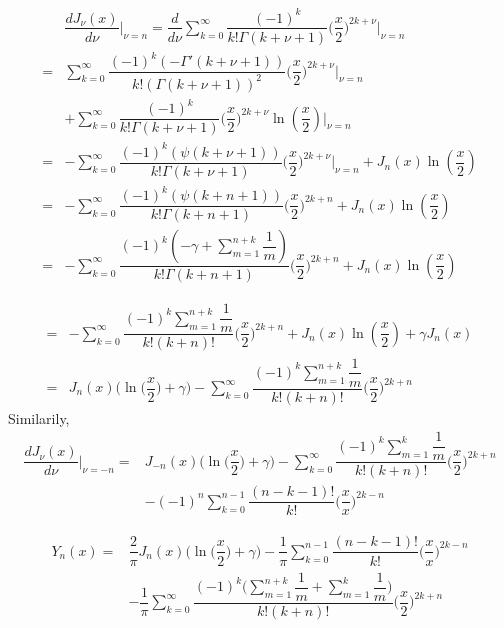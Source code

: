 \documentclass{beamer}
\begin{document}
\begin{frame}
\begin{align*}
&\dfrac{dJ_{\nu}(x)}{d\nu}\Big|_{\nu=n}=\dfrac{d}{d\nu}\sum\limits_{k=0}^{\infty}\dfrac{(-1)^k}{k!\Gamma(k+\nu+1)}\Big(\dfrac{x}{2}\Big)^{2k+\nu}\Big|_{\nu=n}\\
=&\sum\limits_{k=0}^{\infty}\dfrac{(-1)^k(-\Gamma'(k+\nu+1))}{k!(\Gamma(k+\nu+1))^2}\Big(\dfrac{x}{2}\Big)^{2k+\nu}\Big|_{\nu=n}\\
&+\sum\limits_{k=0}^{\infty}\dfrac{(-1)^k}{k!\Gamma(k+\nu+1)}\Big(\dfrac{x}{2}\Big)^{2k+\nu}\ln(\dfrac{x}{2})\Big|_{\nu=n}\\
=&-\sum\limits_{k=0}^{\infty}\dfrac{(-1)^k(\psi(k+\nu+1))}{k!\Gamma(k+\nu+1)}\Big(\dfrac{x}{2}\Big)^{2k+\nu}\Big|_{\nu=n}+J_n(x)\ln(\dfrac{x}{2})\\
=&-\sum\limits_{k=0}^{\infty}\dfrac{(-1)^k(\psi(k+n+1))}{k!\Gamma(k+n+1)}\Big(\dfrac{x}{2}\Big)^{2k+n}+J_n(x)\ln(\dfrac{x}{2})\\
=&-\sum\limits_{k=0}^{\infty}\dfrac{(-1)^k(-\gamma+\sum\limits_{m=1}^{n+k}\dfrac{1}{m})}{k!\Gamma(k+n+1)}\Big(\dfrac{x}{2}\Big)^{2k+n}+J_n(x)\ln(\dfrac{x}{2})
\end{align*}

\end{frame}

\begin{frame}
\begin{align*}
=&-\sum\limits_{k=0}^{\infty}\dfrac{(-1)^k\sum\limits_{m=1}^{n+k}\dfrac{1}{m}}{k!(k+n)!}\Big(\dfrac{x}{2}\Big)^{2k+n}+J_n(x)\ln(\dfrac{x}{2})+\gamma J_n(x)\\
=&J_n(x)\Big(\ln\Big(\dfrac{x}{2}\Big)+\gamma\Big)-\sum\limits_{k=0}^{\infty}\dfrac{(-1)^k\sum\limits_{m=1}^{n+k}\dfrac{1}{m}}{k!(k+n)!}\Big(\dfrac{x}{2}\Big)^{2k+n}
\end{align*}
Similarily,
\begin{align*}
\dfrac{dJ_{\nu}(x)}{d\nu}\Big|_{\nu=-n}=&J_{-n}(x)\Big(\ln\Big(\dfrac{x}{2}\Big)+\gamma\Big)-\sum\limits_{k=0}^{\infty}\dfrac{(-1)^k\sum\limits_{m=1}^{k}\dfrac{1}{m}}{k!(k+n)!}\Big(\dfrac{x}{2}\Big)^{2k+n}\\
&-(-1)^n\sum\limits_{k=0}^{n-1}\dfrac{(n-k-1)!}{k!}\Big(\dfrac{x}{x}\Big)^{2k-n}
\end{align*}
\end{frame}

\begin{frame}
\begin{align*}
Y_{n}(x)=&\dfrac{2}{\pi}J_n(x)\Big(\ln\Big(\dfrac{x}{2}\Big)+\gamma\Big)-\dfrac{1}{\pi}\sum\limits_{k=0}^{n-1}\dfrac{(n-k-1)!}{k!}\Big(\dfrac{x}{x}\Big)^{2k-n}\\
&-\dfrac{1}{\pi}\sum\limits_{k=0}^{\infty}\dfrac{(-1)^k\Big(\sum\limits_{m=1}^{n+k}\dfrac{1}{m}+\sum\limits_{m=1}^{k}\dfrac{1}{m}\Big)}{k!(k+n)!}\Big(\dfrac{x}{2}\Big)^{2k+n}
\end{align*}
\end{frame}
\end{document}
